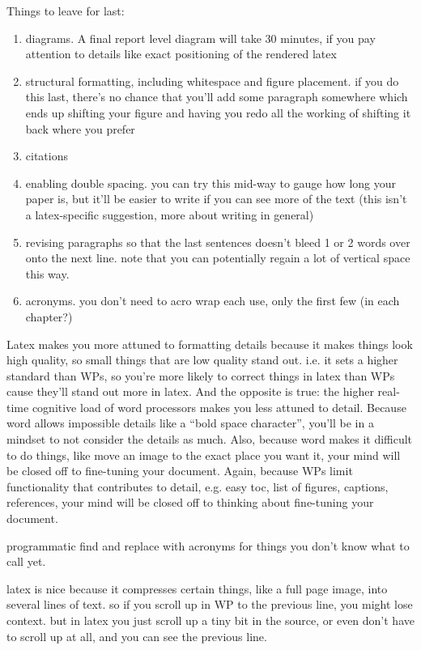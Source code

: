 \documentclass[12pt]{article}
\begin{document}
Things to leave for last:
\begin{enumerate}
  \item diagrams. A final report level diagram will take 30 minutes, if you pay attention to details like exact positioning of the rendered latex
  \item structural formatting, including whitespace and figure placement. if you do this last, there's no chance that you'll add some paragraph somewhere which ends up shifting your figure and having you redo all the working of shifting it back where you prefer
  \item citations
  \item enabling double spacing. you can try this mid-way to gauge how long your paper is, but it'll be easier to write if you can see more of the text (this isn't a latex-specific suggestion, more about writing in general)
  \item revising paragraphs so that the last sentences doesn't bleed 1 or 2 words over onto the next line. note that you can potentially regain a lot of vertical space this way.
  \item acronyms. you don't need to acro wrap each use, only the first few (in each chapter?)
\end{enumerate}

Latex makes you more attuned to formatting details because it makes things look high quality, so small things that are low quality stand out. i.e. it sets a higher standard than WPs, so you're more likely to correct things in latex than WPs cause they'll stand out more in latex. And the opposite is true: the higher real-time cognitive load of word processors makes you less attuned to detail. Because word allows impossible details like a ``bold space character'', you'll be in a mindset to not consider the details as much. Also, because word makes it difficult to do things, like move an image to the exact place you want it, your mind will be closed off to fine-tuning your document. Again, because WPs limit functionality that contributes to detail, e.g. easy toc, list of figures, captions, references, your mind will be closed off to thinking about fine-tuning your document.

programmatic find and replace with acronyms for things you don't know what to call yet.


latex is nice because it compresses certain things, like a full page image, into several lines of text. so if you scroll up in WP to the previous line, you might lose context. but in latex you just scroll up a tiny bit in the source, or even don't have to scroll up at all, and you can see the previous line.
\end{document}
